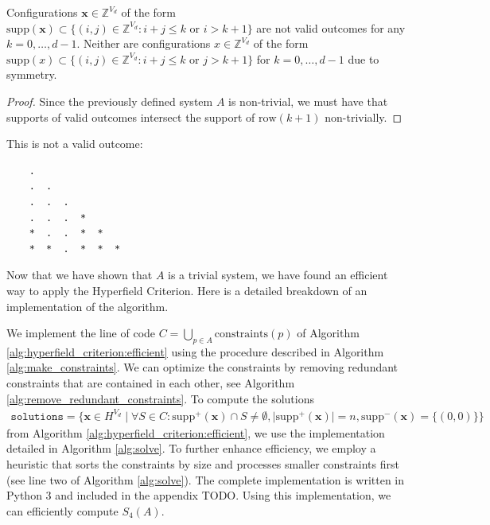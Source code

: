 \begin{corollary}
Configurations $\mathbf{x} \in \mathbb{Z}^{V_{d}}$ of the form $\mathrm{supp}(\mathbf{x}) \subset \{ (i,j) \in \mathbb{Z}^{V_{d}} : i + j \leq k \text{ or } i > k + 1 \}$ are not valid outcomes for any $k = 0, \dots, d-1$. Neither are configurations $x \in \mathbb{Z}^{V_{d}}$ of the form $\mathrm{supp}(x) \subset \{ (i,j) \in \mathbb{Z}^{V_{d}} : i + j \leq k \text{ or } j > k + 1 \}$ for $k = 0, \dots, d-1$ due to symmetry.
\end{corollary}

\begin{proof}
Since the previously defined system $A$ is non-trivial, we must have that supports of valid outcomes intersect the support of $\mathrm{row}(k+1)$ non-trivially.
\end{proof}

\begin{example}
This is not a valid outcome:

    \begin{verbatim}
    .               
    .  .           
    .  .  .
    .  .  .  *
    *  .  .  *  *
    *  *  .  *  *  *
\end{verbatim}
\end{example}

Now that we have shown that $A$ is a trivial system, we have found an efficient way to apply the Hyperfield Criterion. Here is a detailed breakdown of an implementation of the algorithm.

We implement the line of code \( C = \bigcup_{p \in A}\mathrm{constraints}(p) \) of Algorithm \ref{alg:hyperfield_criterion:efficient} using the procedure described in Algorithm \ref{alg:make_constraints}. We can optimize the constraints by removing redundant constraints that are contained in each other, see Algorithm \ref{alg:remove_redundant_constraints}. To compute the solutions
\begin{align*}
    \texttt{solutions} = \{ \mathbf{x} \in H^{V_{d}} \mid \forall S \in C: \mathrm{supp}^+(\mathbf{\mathbf{x}}) \cap S \neq \emptyset, \vert \mathrm{supp}^+(\mathbf{x}) \vert = n,  \mathrm{supp}^-(\mathbf{x}) = \{(0,0)\}   \}
\end{align*}
from Algorithm \ref{alg:hyperfield_criterion:efficient}, we use the implementation detailed in Algorithm \ref{alg:solve}. To further enhance efficiency, we employ a heuristic that sorts the constraints by size and processes smaller constraints first (see line two of Algorithm \ref{alg:solve}). The complete implementation is written in Python \( 3 \) and included in the appendix TODO. Using this implementation, we can efficiently compute \( S_4(A) \).


